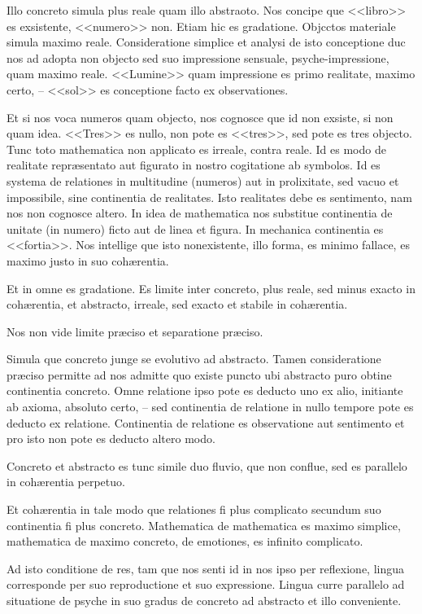 Illo concreto simula plus reale quam illo abstraoto. Nos concipe que <<libro>> es
exsistente, <<numero>> non. Etiam hic es gradatione. Objcctos materiale simula maximo
reale. Consideratione simplice et analysi de isto conceptione duc nos ad adopta non
objecto sed suo impressione sensuale, psyche-impressione, quam maximo reale. <<Lumine>>
quam impressione es primo realitate, maximo certo, – <<sol>> es conceptione facto ex
observationes.

Et si nos voca numeros quam objecto, nos cognosce que id non exsiste, si non quam idea.
<<Tres>> es nullo, non pote es <<tres>>, sed pote es tres objecto. Tunc toto mathematica
non applicato es irreale, contra reale. Id es modo de realitate repr\ae{}sentato aut
figurato in nostro cogitatione ab symbolos. Id es systema de relationes in multitudine
(numeros) aut in prolixitate, sed vacuo et impossibile, sine continentia de realitates.
Isto realitates debe es sentimento, nam nos non cognosce altero. In idea de mathematica
nos substitue continentia de unitate (in numero) ficto aut de linea et figura. In
mechanica continentia es <<fortia>>. Nos intellige que isto nonexistente, illo forma, es
minimo fallace, es maximo justo in suo coh\ae{}rentia.

Et in omne es gradatione. Es limite inter concreto, plus reale, sed minus exacto in
coh\ae{}rentia, et abstracto, irreale, sed exacto et stabile in coh\ae{}rentia.

Nos non vide limite pr\ae{}ciso et separatione pr\ae{}ciso.

Simula que concreto junge se evolutivo ad abstracto. Tamen consideratione pr\ae{}ciso
permitte ad nos admitte quo existe puncto ubi abstracto puro obtine continentia concreto.
Omne relatione ipso pote es deducto uno ex alio, initiante ab axioma, absoluto certo, –
sed continentia de relatione in nullo tempore pote es deducto ex relatione. Continentia
de relatione es observatione aut sentimento et pro isto non pote es deducto altero modo.

Concreto et abstracto es tunc simile duo fluvio, que non conflue, sed es parallelo in
coh\ae{}rentia perpetuo.

Et coh\ae{}rentia in tale modo que relationes fi plus complicato secundum suo continentia
fi plus concreto. Mathematica de mathematica es maximo simplice, mathematica de maximo
concreto, de emotiones, es infinito complicato.

Ad isto conditione de res, tam que nos senti id in nos ipso per reflexione, lingua
corresponde per suo reproductione et suo expressione. Lingua curre parallelo ad
situatione de psyche in suo gradus de concreto ad abstracto et illo conveniente.

